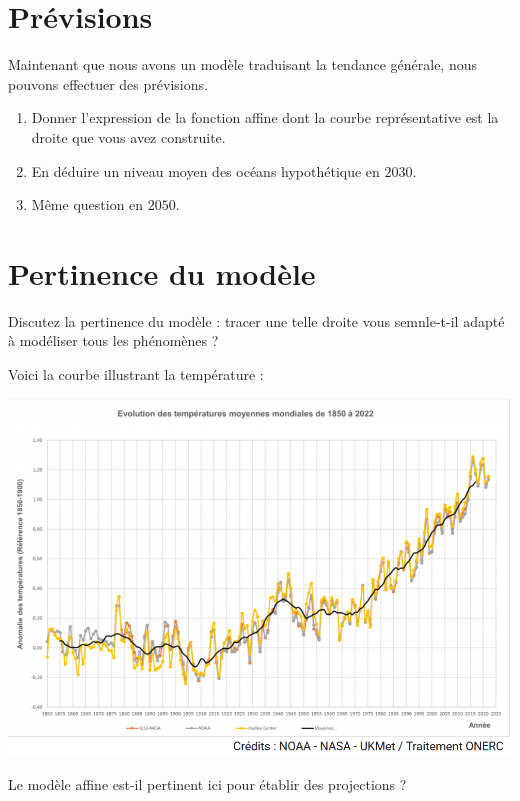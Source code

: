 \documentclass{article}
\begin{document}
\section{Prévisions}
Maintenant que nous avons un modèle traduisant la tendance générale, nous pouvons effectuer des prévisions.
\begin{enumerate}[resume*]
\item Donner l'expression de la fonction affine dont la courbe représentative est la droite que vous avez construite.
\item En déduire un niveau moyen des océans hypothétique en $2030$.
\item Même question en $2050$.
\end{enumerate}
\section{Pertinence du modèle}
Discutez la pertinence du modèle : tracer une telle droite vous semnle-t-il adapté à modéliser tous les phénomènes ?

Voici la courbe illustrant la température :
\begin{center}
\includegraphics[scale=0.6]{Temperatures.png} 
\end{center}

Le modèle affine est-il pertinent ici pour établir des projections ? 
\end{document}
